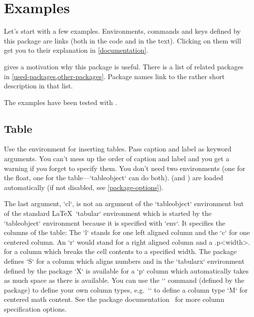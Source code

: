 
\section{Examples}
\label{examples}

Let's start with a few examples.
Environments, commands and keys defined by this package are links (both in the code and in the text).
Clicking on them will get you to their explanation in \cref{documentation}.

 gives a motivation why this package is useful.
There is a list of related packages in \cref{used-packages,other-packages}.
Package names link to the rather short description in that list.

The examples have been tested with \unskip.


\subsection{Table}
\label{table}
Use the  environment for inserting tables.
Pass caption and label as keyword arguments.
You can't mess up the order of caption and label and you get a warning if you forget to specify them.
You don't need two environments (one for the float, one for the table---`tableobject` can do both).
 (and ) are loaded automatically (if not disabled, see \cref{package-options}).

The last argument, `cl`, is not an argument of the `tableobject` environment but of the standard \LaTeX\ `tabular` environment which is started by the `tableobject` environment because it is specified with `env`.
It specifies the columns of the table: The `l` stands for one left aligned column and the `c` for one centered column.
An `r` would stand for a right aligned column and a \xc.p{<width>}. for a column which breaks the cell contents to a specified width.
The  package defines `S` for a column which aligns numbers and in the `tabularx` environment defined by the  package `X` is available for a `p` column which automatically takes as much space as there is available.
You can use the `\newcolumntype` command (defined by the  package) to define your own column types, e.g.\ `` to define a column type `M` for centered math content.
See the  package documentation~\autocite[chapter~1]{array} for more column specification options.


